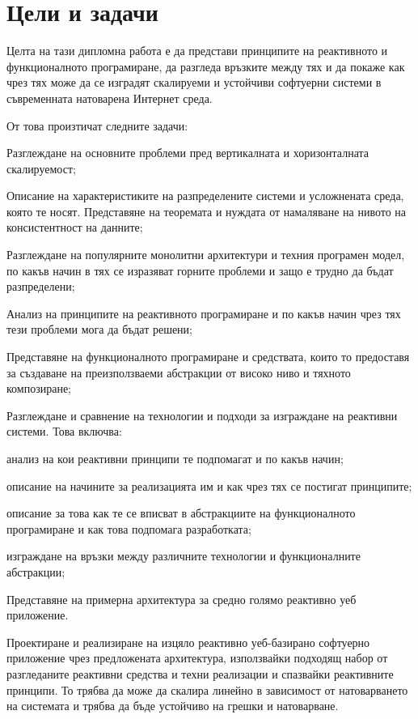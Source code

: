 \section{Цели и задачи}

Целта на тази дипломна работа е да представи принципите на реактивното и функционалното програмиране, да разгледа връзките между тях и да покаже как чрез тях може да се изградят скалируеми и устойчиви софтуерни системи в съвременната натоварена Интернет среда.

От това произтичат следните задачи:
\begin{itemize*}
  \item Разглеждане на основните проблеми пред вертикалната и хоризонталната скалируемост;
  \item Описание на характеристиките на разпределените системи и усложнената среда, която те носят. Представяне на  теоремата и нуждата от намаляване на нивото на консистентност на данните;
  \item Разглеждане на популярните монолитни архитектури и техния програмен модел, по какъв начин в тях се изразяват горните проблеми и защо е трудно да бъдат разпределени;
  \item Анализ на принципите на реактивното програмиране и по какъв начин чрез тях тези проблеми мога да бъдат решени;
  \item Представяне на функционалното програмиране и средствата, които то предоставя за създаване на преизползваеми абстракции от високо ниво и тяхното композиране;
  \item Разглеждане и сравнение на технологии и подходи за изграждане на реактивни системи. Това включва:
  \begin{itemize*}
    \item анализ на кои реактивни принципи те подпомагат и по какъв начин;
    \item описание на начините за реализацията им и как чрез тях се постигат принципите;
    \item описание за това как те се вписват в абстракциите на функционалното програмиране и как това подпомага разработката;
    \item изграждане на връзки между различните технологии и функционалните абстракции;
  \end{itemize*}
  \item Представяне на примерна архитектура за средно голямо реактивно уеб приложение.
  \item Проектиране и реализиране на изцяло реактивно уеб-базирано софтуерно приложение чрез предложената архитектура, използвайки подходящ набор от разгледаните реактивни средства и техни реализации и спазвайки реактивните принципи. То трябва да може да скалира линейно в зависимост от натоварването на системата и трябва да бъде устойчиво на грешки и натоварване.

\end{itemize*}
